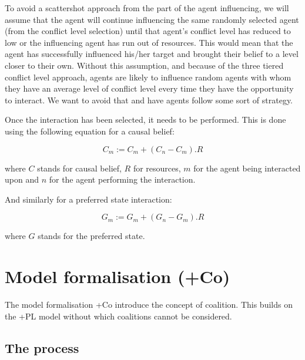 \documentclass[11pt]{article}
\begin{document}
To avoid a scattershot approach from the part of the agent influencing, we will assume that the agent will continue influencing the same randomly selected agent (from the conflict level selection) until that agent's conflict level has reduced to low or the influencing agent has run out of resources. This would mean that the agent has successfully influenced his/her target and brought their belief to a level closer to their own. Without this assumption, and because of the three tiered conflict level approach, agents are likely to influence random agents with whom they have an average level of conflict level every time they have the opportunity to interact. We want to avoid that and have agents follow some sort of strategy. 

Once the interaction has been selected, it needs to be performed. This is done using the following equation for a causal belief:

\begin{equation}
C_{m} := C_{m} + (C_{n} - C_{m}). R
\end{equation}

where $C$ stands for causal belief, $R$ for resources, $m$ for the agent being interacted upon and $n$ for the agent performing the interaction.

And similarly for a preferred state interaction:

\begin{equation}
G_{m} := G_{m} + (G_{n} - G_{m}). R
\end{equation}

where $G$ stands for the preferred state.




\section{Model formalisation (+Co)}

The model formalisation +Co introduce the concept of coalition. This builds on the +PL model without which coalitions cannot be considered.

\subsection{The process}
\end{document}
